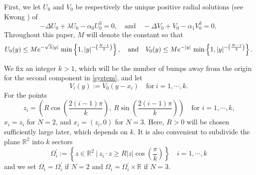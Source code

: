 \documentclass{amsart}
\theoremstyle{definition}
\theoremstyle{remark}
\numberwithin{equation}{section}
\begin{document}
First, we let $U_{0}$ and $V_{0}$ be respectively the unique  {positive} radial solutions (see Kwong \cite{Kwong}) of
\begin{equation}\label{u0v0}
 -\Delta U_{0} + \lambda U_{0} - \alpha_0 U_{0}^3 = 0, \quad \text{and} \quad -\Delta V_{0} + V_{0} - \alpha_1 V_{0}^3 = 0,
\end{equation}
Throughout this paper, $M$ will denote the constant so that
\begin{equation}\label{exp}U_{0}(y) \le Me^{-\sqrt{\lambda}|y|}~{\rm min}\left\{1, |y|^{-\left(\frac{N-1}{2}\right)}\right\}, \quad \text{and} \quad V_{0}(y) \le Me^{-|y|}~{\rm min}\left\{1, |y|^{-\left(\frac{N-1}{2}\right)}\right\}.\end{equation}


We fix an integer $k>1$, which will be the number of bumps away from the origin for the second component in \ref{system}, and let \[V_{i}(y):=V_{0}(y-x_i)\quad\mbox{for}\  i=1,\cdots,k.\] For the points
$$z_i= \left( R \cos\left(\frac{2(i-1)\pi}{k}\right), ~R \sin\left(\frac{2(i-1)\pi}{k}\right)\right) \quad \text{for $i=1,\cdots,k$,}$$
$x_i = z_i$ for $N=2$, and $x_i = (z_i,0)$ for $N=3$.  Here, $R>0$ will be chosen sufficiently large later, which depends on $k$. It is also convenient to subdivide the plane $\mathbb{R}^2$ into $k$ sectors
\begin{equation}\label{sectors}
\Omega^\prime_i := \left\{z \in \mathbb{R}^2~\Big|~ z_i\cdot z \ge  {R}|z|\cos\left(\frac{\pi}{k}\right)\right\} \quad i=1,\cdots,k 
\end{equation}
and we set $\Omega_i = \Omega^\prime_i$ if $N=2$ and $\Omega_i = \Omega^\prime_i \times \mathbb{R}$ if $N=3$.
\end{document}

